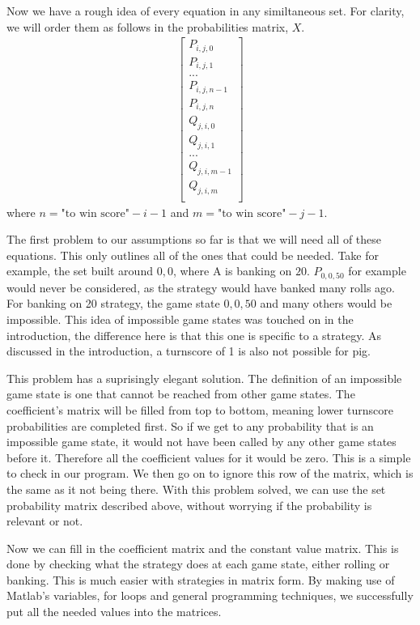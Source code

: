 \documentclass[a4paper,titlepage]{article}
\begin{document}
Now we have a rough idea of every equation in any similtaneous set. For clarity, we will order them as follows in the probabilities matrix, $X$.
\begin{align}
	\begin{bmatrix}
		P_{i,j,0}\\
		P_{i,j,1}\\
		...\\
		P_{i,j,n-1}\\
		P_{i,j,n}\\
		Q_{j,i,0}\\
		Q_{j,i,1}\\
		...\\
		Q_{j,i,m-1}\\
		Q_{j,i,m}\\
	\end{bmatrix}
\end{align}
where $n=\text{"to win score"}-i-1$ and $m=\text{"to win score"}-j-1$.

The first problem to our assumptions so far is that we will need all of these equations. This only outlines all of the ones that could be needed. Take for example, the set built around $0,0$, where A is banking on $20$. $P_{0,0,50}$ for example would never be considered, as the strategy would have banked many rolls ago. For banking on 20 strategy, the game state $0,0,50$ and many others would be impossible. This idea of impossible game states was touched on in the introduction, the difference here is that this one is specific to a strategy. As discussed in the introduction, a turnscore of 1 is also not possible for pig.

This problem has a suprisingly elegant solution. The definition of an impossible game state is one that cannot be reached from other game states. The coefficient's matrix will be filled from top to bottom, meaning lower turnscore probabilities are completed first. So if we get to any probability that is an impossible game state, it would not have been called by any other game states before it. Therefore all the coefficient values for it would be zero. This is a simple to check in our program. We then go on to ignore this row of the matrix, which is the same as it not being there. With this problem solved, we can use the set probability matrix described above, without worrying if the probability is relevant or not.

Now we can fill in the coefficient matrix and the constant value matrix. This is done by checking what the strategy does at each game state, either rolling or banking. This is much easier with strategies in matrix form. By making use of Matlab's variables, for loops and general programming techniques, we successfully put all the needed values into the matrices.
\end{document}
